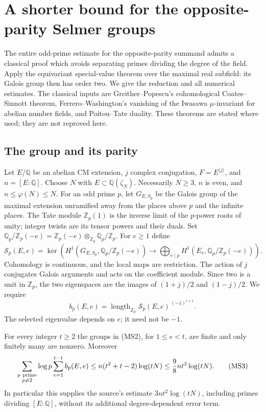 \section{A shorter bound for the opposite-parity Selmer groups}
\label{ms-section}

The entire odd-prime estimate for the opposite-parity summand
admits a classical proof which avoids separating primes dividing
the degree of the field.  Apply the equivariant special-value
theorem over the maximal real subfield: its Galois group then
has order two.  We give the reduction and all numerical estimates.
The classical inputs are Greither--Popescu's cohomological
Coates--Sinnott theorem, Ferrero--Washington's vanishing of the
Iwasawa $\mu$-invariant for abelian number fields, and
Poitou--Tate duality.  These theorems are stated where used;
they are not reproved here.

\subsection{The group and its parity}

Let $E/\mathbb Q$ be an abelian CM extension, $j$ complex
conjugation, $F=E^{\langle j\rangle}$, and $n=[E:\mathbb Q]$.
Choose $N$ with $E\subset\mathbb Q(\zeta_N)$.
Necessarily $N\ge3$, $n$ is even, and $n\le\varphi(N)\le N$.
For an odd prime $p$, let $G_{E,S_p}$ be the Galois group
of the maximal extension unramified away from the places
above $p$ and the infinite places.
The Tate module $\mathbb Z_p(1)$ is the inverse limit of the
$p$-power roots of unity; integer twists are its tensor powers
and their duals.  Set
$\mathbb Q_p/\mathbb Z_p(-e)=
\mathbb Z_p(-e)\otimes_{\mathbb Z_p}\mathbb Q_p/\mathbb Z_p$.
For $e\ge1$ define
\[
 \mathcal S_p(E,e)=
 \ker\left(H^1(G_{E,S_p},\mathbb Q_p/\mathbb Z_p(-e))
       \longrightarrow
       \bigoplus_{v\mid p}H^1(E_v,\mathbb Q_p/\mathbb Z_p(-e))
       \right).
 \tag{MS1}
\]
Cohomology is continuous, and the local maps are restriction.
The action of $j$ conjugates Galois arguments and acts on
the coefficient module.  Since two is a unit in $\mathbb Z_p$,
the two eigenspaces are the images of $(1+j)/2$ and $(1-j)/2$.
We require
\[
 b_p(E,e)=\operatorname{length}_{\mathbb Z_p}
                     \mathcal S_p(E,e)^{\,(-1)^{e+1}}.
 \tag{MS2}
\]
The selected eigenvalue depends on $e$; it need not be $-1$.

\begin{theorem}\label{ms-main}
For every integer $t\ge2$ the groups in \textup{(MS2)}, for
$1\le e<t$, are finite and only finitely many are nonzero.
Moreover
\[
 \sum_{\substack{p\ {\rm prime}\\p\ne2}}\log p
       \sum_{e=1}^{t-1} b_p(E,e)
 \le n(t^2+t-2)\log(tN)
 \le \frac98 n t^2\log(tN).
 \tag{MS3}
\]
In particular this supplies the source's estimate
$3nt^2\log(tN)$, including primes dividing $[E:\mathbb Q]$,
without its additional degree-dependent error term.
\end{theorem}


